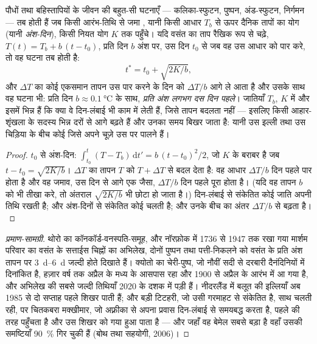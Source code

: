 \begin{theorem}[अंश-दिन और वसंत का जल्दी आना]\label{thm:b2:global-change:phenology}
पौधों तथा बहिस्तापियों के जीवन की बहुत-सी घटनाएँ --- कलिका-स्फुटन,
पुष्पन, अंड-स्फुटन, निर्गमन --- तब होती हैं जब किसी आरंभ-तिथि से जमा
\emph{}, यानी किसी आधार $T_b$ से ऊपर दैनिक
तापों का योग (यानी \emph{अंश-दिन}), किसी नियत योग $K$ तक पहुँचे।
यदि वसंत का ताप रैखिक रूप से चढ़े, $T(t) = T_b
+ b\,(t - t_0)$, प्रति दिन $b$ अंश पर, उस दिन $t_0$ से जब वह उस आधार को पार करे,
तो वह घटना तब होती है:
\[
t^{*} = t_0 + \sqrt{2K/b},
\]
और $\Delta T$ का कोई एकसमान तापन उस पार करने के दिन को
$\Delta T/b$ आगे ले आता है और उसके साथ वह घटना भी: प्रति दिन $b \approx
\qty{0.1}{\celsius}$ के साथ, \emph{प्रति अंश लगभग दस दिन
पहले}। जातियाँ $T_b$, $K$ में और इसमें भिन्न हैं कि क्या वे
दिन-लंबाई भी काम में लेती हैं, जिसे तापन बदलता नहीं --- इसलिए किसी
आहार-शृंखला के सदस्य भिन्न दरों से आगे बढ़ते हैं और उनका समय
बिखर जाता है: यानी उस इल्ली तथा उस चिड़िया के बीच कोई \emph{}
जिसे अपने चूज़े उस पर पालने हैं।
\end{theorem}
\begin{proof}
$t_0$ से अंश-दिन: $\int_{t_0}^{t}(T - T_b)\,\mathrm{d}t' =
b\,(t - t_0)^{2}/2$, जो $K$ के बराबर है जब $t - t_0 = \sqrt{2K/b}$।
$\Delta T$ का तापन $T$ को $T + \Delta T$ से बदल देता है: वह आधार
$\Delta T/b$ दिन पहले पार होता है और वह जमाव, उस दिन से आगे एक जैसा,
$\Delta T/b$ दिन पहले पूरा होता है। (यदि वह
तापन $b$ को भी तीखा करे, तो अंतराल $\sqrt{2K/b}$ भी छोटा
हो जाता है।) दिन-लंबाई से संकेतित कोई जाति अपनी तिथि रखती है; और
अंश-दिनों से संकेतित कोई चलती है; और उनके बीच का अंतर $\Delta T/b$ से बढ़ता है।
\end{proof}
\begin{proof}[प्रमाण-सामग्री]
थोरो का कॉनकॉर्ड-वनस्पति-समूह, और नॉरफ़ोक में 1736 से 1947 तक रखा गया
मार्शम परिवार का वसंत के सत्ताईस चिह्नों का अभिलेख,
दोनों पुष्पन तथा पत्ती-निकलने को वसंत के प्रति अंश तापन पर
\qtyrange{3}{6}{d} जल्दी होते दिखाते हैं। क्योतो का चेरी-पुष्प, जो
नौवीं सदी से दरबारी दैनंदिनियों में दिनांकित है,
हज़ार वर्ष तक अप्रैल के मध्य के आसपास रहा और 1900 से अप्रैल के आरंभ में
आ गया है, और अभिलेख की सबसे जल्दी तिथियाँ 2020 के दशक में पड़ी हैं। नीदरलैंड में
बलूत की इल्लियाँ अब 1985 से दो सप्ताह पहले शिखर पाती हैं; और
बड़ी टिटहरी, जो उसी गरमाहट से संकेतित है, साथ चलती रही, पर चितकबरा
मक्खीमार, जो अफ़्रीका से अपना प्रवास दिन-लंबाई से समयबद्ध करता है,
पहले की तरह पहुँचता है और उस शिखर को गया हुआ पाता है --- और जहाँ वह बेमेल सबसे बड़ा है
वहाँ उसकी समष्टियाँ \qty{90}{\%} गिर चुकी हैं (बोथ तथा
सहयोगी, 2006)।
\end{proof}

